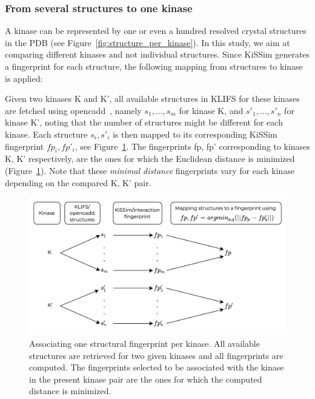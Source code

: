 \documentclass[9pt,training]{livecoms}
\newcommand{\kinA}{K}
\newcommand{\kinB}{K'}
\begin{document}
\subsubsection{From several structures to one kinase}

A kinase can be represented by one or even a hundred resolved crystal structures in the PDB (see Figure~\ref{fig:structure_per_kinase}). In this study, we aim at comparing different kinases and not individual structures. Since KiSSim generates a fingerprint for each structure, the following mapping from structures to kinase is applied:

Given two kinases \kinA{} and \kinB{}, all available structures in KLIFS for these kinases are fetched using opencadd~\cite{Sydow_2022_JOSS}, namely $s_1, \dots, s_m$ for kinase \kinA, and $s'_1, \dots, s'_n$ for kinase \kinB, noting that the number of structures might be different for each kinase. Each structure $s_i, s'_i$ is then mapped to its corresponding KiSSim fingerprint $fp_i, fp'_i$, see Figure~\ref{fig:structure_to_kinase}. The fingerprints fp, fp' corresponding to kinases \kinA{}, \kinB{} respectively, are the ones for which the Euclidean distance is minimized (Figure~\ref{fig:structure_to_kinase}). Note that these \textit{minimal distance} fingerprints vary for each kinase depending on the compared \kinA{}, \kinB{} pair.

\begin{figure}[ht]
    \centering
    \includegraphics[width=\columnwidth]{structure_to_kinase.png}
    \caption{Associating one structural fingerprint per kinase. All available structures are retrieved for two given kinases and all fingerprints are computed. The fingerprints selected to be associated with the kinase in the present kinase pair are the ones for which the computed distance is minimized.}
    \label{fig:structure_to_kinase}
\end{figure}
\end{document}
